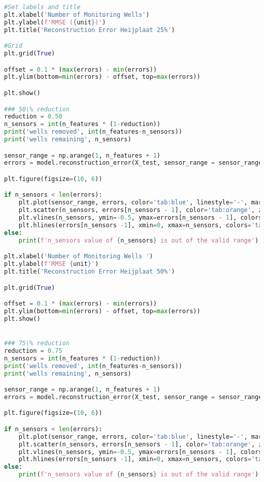 \begin{lstlisting}[language=Python]
#Set labels and title 
plt.xlabel('Number of Monitoring Wells')
plt.ylabel(f'RMSE ({unit})')
plt.title('Reconstruction Error Heijplaat 25%')

#Grid 
plt.grid(True)

offset = 0.1 * (max(errors) - min(errors))
plt.ylim(bottom=min(errors) - offset, top=max(errors))

plt.show()

### 50\% reduction
reduction = 0.50
n_sensors = int(n_features * (1-reduction))
print('wells removed', int(n_features-n_sensors))
print('wells remaining', n_sensors)

sensor_range = np.arange(1, n_features + 1)
errors = model.reconstruction_error(X_test, sensor_range = sensor_range)

plt.figure(figsize=(10, 6))

if n_sensors < len(errors): 
    plt.plot(sensor_range, errors, color='tab:blue', linestyle='-', marker='')
    plt.scatter(n_sensors, errors[n_sensors - 1], color='tab:orange', zorder=5)
    plt.vlines(n_sensors, ymin=-0.5, ymax=errors[n_sensors - 1], colors='tab:orange', linestyle='--', linewidth=2.0, label='Selected number of wells')
    plt.hlines(errors[n_sensors -1], xmin=0, xmax=n_sensors, colors='tab:orange', linestyle='--', linewidth=2.0)
else: 
    print(f'n_sensors value of {n_sensors} is out of the valid range')

plt.xlabel('Number of Monitoring Wells ')
plt.ylabel(f'RMSE {unit}')
plt.title('Reconstruction Error Heijplaat 50%')

plt.grid(True)

offset = 0.1 * (max(errors) - min(errors))
plt.ylim(bottom=min(errors) - offset, top=max(errors))
plt.show()


### 75\% reduction
reduction = 0.75
n_sensors = int(n_features * (1-reduction))
print('wells removed', int(n_features-n_sensors))
print('wells remaining', n_sensors)

sensor_range = np.arange(1, n_features + 1)
errors = model.reconstruction_error(X_test, sensor_range = sensor_range)

plt.figure(figsize=(10, 6))

if n_sensors < len(errors): 
    plt.plot(sensor_range, errors, color='tab:blue', linestyle='-', marker='')
    plt.scatter(n_sensors, errors[n_sensors - 1], color='tab:orange', zorder=5)
    plt.vlines(n_sensors, ymin=-0.5, ymax=errors[n_sensors - 1], colors='tab:orange', linestyle='--', linewidth=2.0, label='Selected number of wells')
    plt.hlines(errors[n_sensors -1], xmin=0, xmax=n_sensors, colors='tab:orange', linestyle='--', linewidth=2.0)
else: 
    print(f'n_sensors value of {n_sensors} is out of the valid range')


\end{lstlisting}
